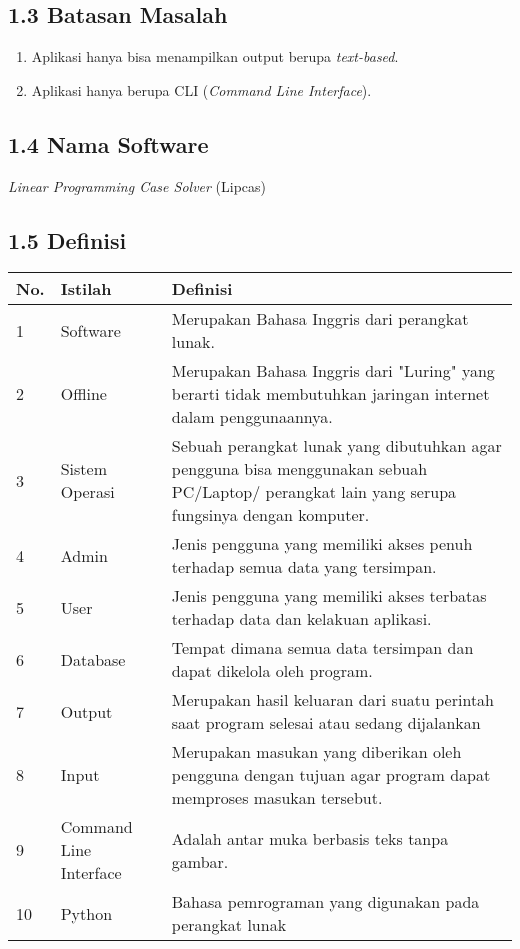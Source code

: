 \documentclass[a4paper]{article}
\begin{document}
    \subsection*{1.3 Batasan Masalah}
    \begin{enumerate}
        \item Aplikasi hanya bisa menampilkan output berupa \textit{text-based}.
        \item Aplikasi hanya berupa CLI (\textit{Command Line Interface}).
    \end{enumerate}
    \subsection*{1.4 Nama Software}
    \noindent \textit{Linear Programming Case Solver} (Lipcas)
    \subsection*{1.5 Definisi }
    \begin{tabular}{ | m{1em}| m{} | m{} | }
        \hline
        \textbf{No.} & \textbf{Istilah} & \textbf{Definisi}\\
        \hline
        1 & Software & Merupakan Bahasa Inggris dari perangkat lunak.\\
        \hline
        2 & Offline & Merupakan Bahasa Inggris dari "Luring" yang berarti tidak
        membutuhkan jaringan internet dalam penggunaannya.\\
        \hline
        3 & Sistem Operasi & Sebuah perangkat lunak yang dibutuhkan
        agar pengguna bisa menggunakan sebuah PC/Laptop/ perangkat lain
        yang serupa fungsinya dengan komputer.\\
        \hline
        4 & Admin & Jenis pengguna yang memiliki akses penuh terhadap
        semua data yang tersimpan.\\
        \hline
        5 & User & Jenis pengguna yang memiliki akses terbatas terhadap
        data dan kelakuan aplikasi.\\
        \hline
        6 & Database & Tempat dimana semua data tersimpan dan dapat dikelola
        oleh program.\\
        \hline
        7 & Output & Merupakan hasil keluaran dari suatu perintah saat program
        selesai atau sedang dijalankan\\
        \hline
        8 & Input & Merupakan masukan yang diberikan oleh pengguna dengan tujuan 
        agar program dapat memproses masukan tersebut.\\
        \hline
        9 & Command Line Interface & Adalah antar muka berbasis teks tanpa gambar.\\
        \hline
        10 & Python & Bahasa pemrograman yang digunakan pada perangkat lunak \\
        \hline
    \end{tabular}
\end{document}
